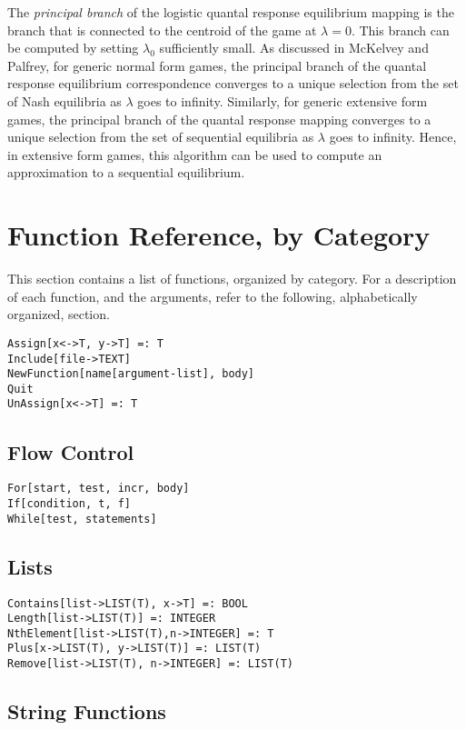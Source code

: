 The {\em principal branch} of the logistic quantal response
equilibrium mapping is the branch that is connected to the centroid of
the game at $\lambda = 0$.  This branch can be computed by setting
$\lambda_0$ sufficiently small.  As discussed in McKelvey and Palfrey,
for generic normal form games, the principal branch of the quantal
response equilibrium correspondence converges to a unique selection
from the set of Nash equilibria as $\lambda$ goes to infinity.
Similarly, for generic extensive form games, the principal branch of
the quantal response mapping converges to a unique selection from the
set of sequential equilibria as $\lambda$ goes to infinity.  Hence, in
extensive form games, this algorithm can be used to compute an
approximation to a sequential equilibrium.

\section{Function Reference, by Category}

This section contains a list of functions, organized by
category.  For a description of each function, and the arguments,
refer to the following, alphabetically organized, section.

\begin{verbatim}
Assign[x<->T, y->T] =: T
Include[file->TEXT]
NewFunction[name[argument-list], body]
Quit
UnAssign[x<->T] =: T
\end{verbatim}

\subsection{Flow Control}

\begin{verbatim}
For[start, test, incr, body]
If[condition, t, f]
While[test, statements]
\end{verbatim}

\subsection{Lists}

\begin{verbatim}
Contains[list->LIST(T), x->T] =: BOOL
Length[list->LIST(T)] =: INTEGER
NthElement[list->LIST(T),n->INTEGER] =: T 
Plus[x->LIST(T), y->LIST(T)] =: LIST(T)
Remove[list->LIST(T), n->INTEGER] =: LIST(T)
\end{verbatim}

\subsection{String Functions}

